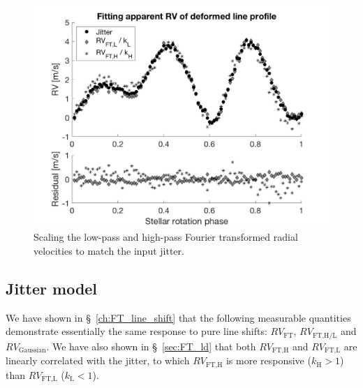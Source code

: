 \begin{figure}[tbp]
\centering
\includegraphics[width = 0.7 \linewidth]
{./Figures/Methods/5-JITTER_ONLY_4.png}
\caption[Scaling the low-pass and high-pass Fourier transformed radial velocities]
{Scaling the low-pass and high-pass Fourier transformed radial velocities to match the input jitter.}
\label{fig:scaling_RV_FT}
\end{figure} 

\subsection{Jitter model}
\label{subsec:Jitter_model}

We have shown in \S~\ref{ch:FT_line_shift} that the following measurable quantities demonstrate essentially the same response to pure line shifts: $RV_\text{FT}$, $RV_\text{FT,H/L}$ and $RV_\text{Gaussian}$. We have also shown in \S~\ref{sec:FT_ld} that both $RV_\text{FT,H}$ and $RV_\text{FT,L}$ are linearly correlated with the jitter, to which $RV_\text{FT,H}$ is more responsive ($k_\text{H}>1$) than $RV_\text{FT,L}$ ($k_\text{L}<1$). 

